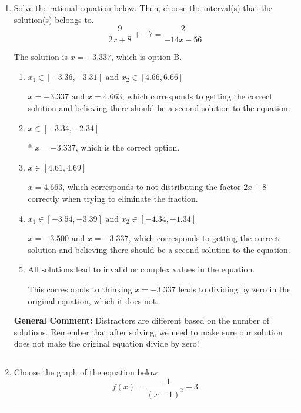 \documentclass{extbook}[14pt]
\newcommand{\litem}[1]{\item #1

\rule{\textwidth}{0.4pt}}
\begin{document}
\begin{enumerate}\litem{
Solve the rational equation below. Then, choose the interval(s) that the solution(s) belongs to.
\[ \frac{9}{2x + 8} + -7 = \frac{2}{-14x -56} \]

The solution is \( x = -3.337 \), which is option B.\begin{enumerate}[label=\Alph*.]
\item \( x_1 \in [-3.36, -3.31] \text{ and } x_2 \in [4.66,6.66] \)

$x = -3.337 \text{ and } x = 4.663$, which corresponds to getting the correct solution and believing there should be a second solution to the equation.
\item \( x \in [-3.34,-2.34] \)

* $x = -3.337$, which is the correct option.
\item \( x \in [4.61,4.69] \)

$x = 4.663$, which corresponds to not distributing the factor $2x + 8$ correctly when trying to eliminate the fraction.
\item \( x_1 \in [-3.54, -3.39] \text{ and } x_2 \in [-4.34,-1.34] \)

$x = -3.500 \text{ and } x = -3.337$, which corresponds to getting the correct solution and believing there should be a second solution to the equation.
\item \( \text{All solutions lead to invalid or complex values in the equation.} \)

This corresponds to thinking $x = -3.337$ leads to dividing by zero in the original equation, which it does not.
\end{enumerate}

\textbf{General Comment:} Distractors are different based on the number of solutions. Remember that after solving, we need to make sure our solution does not make the original equation divide by zero!
}
\litem{
Choose the graph of the equation below.
\[ f(x) = \frac{-1}{(x - 1)^2} + 3 \]

}
\end{enumerate}
\end{document}
